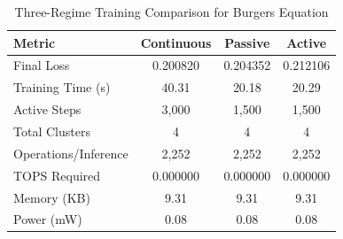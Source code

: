 \begin{table}[htbp]
\centering
\caption{Three-Regime Training Comparison for Burgers Equation}
\label{tab:three_regime_comparison}
\begin{tabular}{l|ccc}
\hline
\textbf{Metric} & \textbf{Continuous} & \textbf{Passive} & \textbf{Active} \\
\hline
Final Loss & 0.200820 & 0.204352 & 0.212106 \\
Training Time (s) & 40.31 & 20.18 & 20.29 \\
Active Steps & 3,000 & 1,500 & 1,500 \\
Total Clusters & 4 & 4 & 4 \\
Operations/Inference & 2,252 & 2,252 & 2,252 \\
TOPS Required & 0.000000 & 0.000000 & 0.000000 \\
Memory (KB) & 9.31 & 9.31 & 9.31 \\
Power (mW) & 0.08 & 0.08 & 0.08 \\
\hline
\end{tabular}
\end{table}

